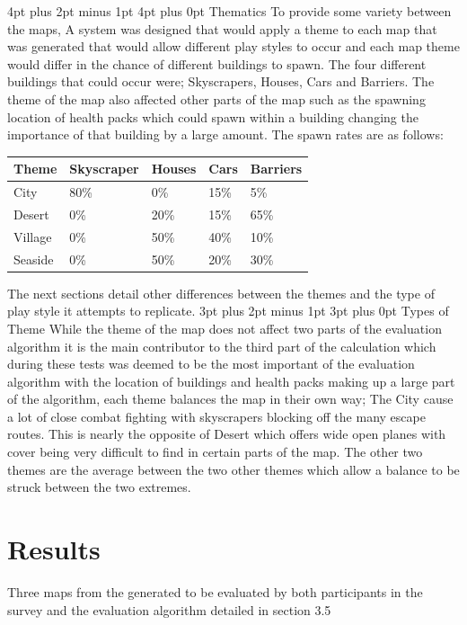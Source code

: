 \documentclass[12pt,a4paper,oneside]{book}
\makeatletter
\renewcommand\subsection{\@startsection {subsection}{1}{2mm} %
                               {3pt plus 2pt minus 1pt} %
                               {3pt plus 0pt} %
                               {\normalfont\bfseries}}
\renewcommand\section{\@startsection {section}{1}{0mm} %
                               {4pt plus 2pt minus 1pt} %
                               {4pt plus 0pt} %
                               {\bfseries}}
\makeatother
\begin{document}
\section{Thematics}
To provide some variety between the maps, A system was designed that would apply a theme to each map that was generated that would allow different play styles to occur and each map theme would differ in the chance of different buildings to spawn. The four different buildings that could occur were; Skyscrapers, Houses, Cars and Barriers. The theme of the map also affected other parts of the map such as the spawning location of health packs which could spawn within a building changing the importance of that building by a large amount. The spawn rates are as follows: 
\vspace{5mm} 
\newline 
\begin{tabular}{ |p{3cm}||p{2cm}|p{2cm}|p{2cm}|p{2cm}|  }
	\hline
	Theme& Skyscraper &Houses&Cars & Barriers\\
	\hline
	City   & 80\%    &0\% &   15\% & 5\%\\
	Desert & 0\%    &20\% &   15\% & 65\%\\
	Village &0\%    &50\% &   40\% & 10\%\\
	Seaside  &0\%    &50\% &   20\% &30\%\\
	\hline
\end{tabular} 
\vspace{5mm} 
\newline
The next sections detail other differences between the themes and the type of play style it attempts to replicate. 
\subsection{Types of Theme}
While the theme of the map does not affect two parts of the evaluation algorithm it is the main contributor to the third part of the calculation which during these tests was deemed to be the most important of the evaluation algorithm with the location of buildings and health packs making up a large part of the algorithm, each theme balances the map in their own way; The City cause a lot of close combat fighting with skyscrapers blocking off the many escape routes. This is nearly the opposite of Desert which offers wide open planes with cover being very difficult to find in certain parts of the map. The other two  themes are the average between the two other themes which allow a balance to be struck between the two extremes. 
\chapter{Results}
Three maps from the generated to be evaluated by both participants in the survey and the evaluation algorithm detailed in section 3.5
\end{document}
